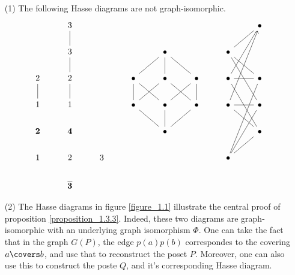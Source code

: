 \begin{example}\label{exmaple_1.8}
  \begin{enumerate}
    \item[(1)] The following Hasse diagrams are not graph-isomorphic.
      \[\begin{tikzcd}
  & 3 &&&&&& \bullet \\
  & 3 &&& \bullet && \bullet \\
        2 & 2 && \bullet & \bullet & \bullet & \bullet & \bullet \\
        1 & 1 && \bullet & \bullet & \bullet & \bullet & \bullet \\
        {\textbf{2}} & {\textbf{4}} &&& \bullet &&& \bullet \\
        1 & 2 & 3 &&&& \bullet \\
          & {\bar{\textbf{3}}}
          \arrow[no head, from=2-2, to=1-2]
          \arrow[no head, from=2-7, to=1-8]
          \arrow[no head, from=2-7, to=3-8]
          \arrow[no head, from=2-7, to=4-8]
          \arrow[no head, from=3-2, to=2-2]
          \arrow[no head, from=3-4, to=2-5]
          \arrow[no head, from=3-5, to=2-5]
          \arrow[no head, from=3-5, to=4-4]
          \arrow[no head, from=3-5, to=4-6]
          \arrow[no head, from=3-6, to=2-5]
          \arrow[no head, from=3-7, to=1-8]
          \arrow[no head, from=3-7, to=3-8]
          \arrow[no head, from=3-7, to=5-8]
          \arrow[no head, from=4-1, to=3-1]
          \arrow[no head, from=4-2, to=3-2]
          \arrow[no head, from=4-4, to=3-4]
          \arrow[no head, from=4-5, to=3-4]
          \arrow[no head, from=4-5, to=3-6]
          \arrow[no head, from=4-6, to=3-6]
          \arrow[from=4-7, to=1-8]
          \arrow[no head, from=4-7, to=4-8]
          \arrow[no head, from=4-7, to=5-8]
          \arrow[no head, from=5-5, to=4-4]
          \arrow[no head, from=5-5, to=4-5]
          \arrow[no head, from=5-5, to=4-6]
          \arrow[no head, from=6-7, to=3-8]
          \arrow[no head, from=6-7, to=4-8]
          \arrow[no head, from=6-7, to=5-8]
      \end{tikzcd}\]

    \item[(2)] The Hasse diagrams in figure \ref{figure_1.1}
      illustrate the central proof of proposition
      \ref{proposition_1.3.3}. Indeed, these two diagrams are
      graph-isomorphic with an underlying graph isomorphism $\Phi$.
      One can take the fact that in the graph $G(P)$, the edge
      $p(a)p(b)$ correspondes to the covering $a \covers b$, and use
      that to reconstruct the poset $P$. Moreover, one can also use
      this to construct the poste $Q$, and it's corresponding Hasse
      diagram.


\end{enumerate}
\end{example}
